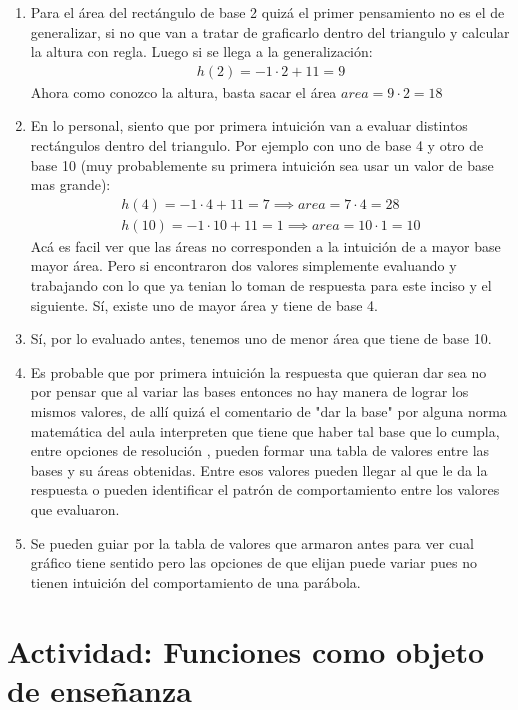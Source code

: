 \documentclass[a4paper]{article}
\begin{document}
\begin{enumerate}
    \item Para el área del rectángulo de base 2 quizá el primer pensamiento no es el de generalizar, si no que van a tratar de graficarlo dentro del triangulo y calcular la altura con regla. Luego si se llega a la generalización:
    \begin{align*}
        h(2)=-1 \cdot 2 +11 = 9
    \end{align*}
    Ahora como conozco la altura, basta sacar el área $area=9 \cdot 2=18$
    \item En lo personal, siento que por primera intuición van a evaluar distintos rectángulos dentro del triangulo. Por ejemplo con uno de base 4 y otro de base 10 (muy probablemente su primera intuición sea usar un valor de base mas grande):
    \begin{gather*}
        h(4)=-1\cdot 4 +11=7 \implies area=7\cdot 4=28\\
        h(10)=-1\cdot 10 +11=1 \implies area= 10\cdot 1=10
    \end{gather*}
    Acá es facil ver que las áreas no corresponden a la intuición de a mayor base mayor área. Pero si encontraron dos valores simplemente evaluando y trabajando con lo que ya tenian lo toman de respuesta para este inciso y el siguiente. Sí, existe uno de mayor área y tiene de base 4.
    \item Sí, por lo evaluado antes, tenemos uno de menor área que tiene de base 10.
    \item Es probable que por primera intuición la respuesta que quieran dar sea no por pensar que al variar las bases entonces no hay manera de lograr los mismos valores, de allí quizá el comentario de "dar la base" por alguna norma matemática del aula interpreten que tiene que haber tal base que lo cumpla, entre opciones de resolución , pueden formar una tabla de valores entre las bases y su áreas obtenidas. Entre esos valores pueden llegar al que le da la respuesta o pueden identificar el patrón de comportamiento entre los valores que evaluaron.
    \item Se pueden guiar por la tabla de valores que armaron antes para ver cual gráfico tiene sentido pero las opciones de que elijan puede variar pues no tienen intuición del comportamiento de una parábola.

\end{enumerate}
\section{Actividad: Funciones como objeto de enseñanza}
\end{document}
